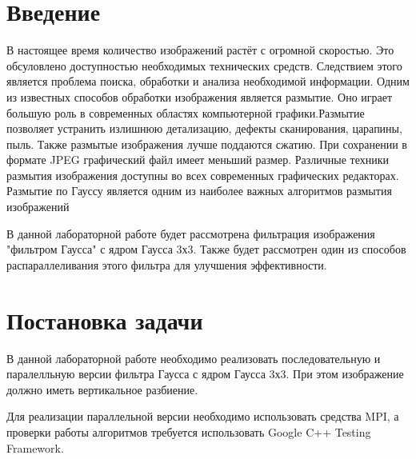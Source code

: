 \documentclass{report}
\begin{document}
\setcounter{page}{2}

\tableofcontents
\newpage

\section*{Введение}
В настоящее время количество изображений растёт с огромной скоростью. Это обсуловлено доступностью необходимых технических средств. Следствием этого является проблема поиска, обработки и анализа необходимой информации. Одним из известных способов обработки изображения является размытие. Оно играет большую роль в современных областях компьютерной графики.Размытие позволяет устранить излишнюю детализацию, дефекты сканирования, царапины, пыль. Также размытые изображения лучше поддаются сжатию. При сохранении в формате JPEG графический файл имеет меньший размер. Различные техники размытия изображения доступны во всех современных графических редакторах. Размытие по Гауссу является одним из наиболее важных алгоритмов размытия изображений
\par В данной лабораторной работе будет рассмотрена фильтрация изображения "фильтром Гаусса" с ядром Гаусса 3х3. Также будет рассмотрен один из способов распараллеливания этого фильтра для улучшения эффективности.
\newpage

\section*{Постановка задачи}
В данной лабораторной работе необходимо реализовать последовательную и паралелльную версии фильтра Гаусса с ядром Гаусса 3х3. При этом изображение должно иметь вертикальное разбиение.
\par Для реализации параллельной версии необходимо использовать средства MPI, а проверки работы алгоритмов требуется использовать Google C++ Testing Framework.
\newpage

\end{document}
